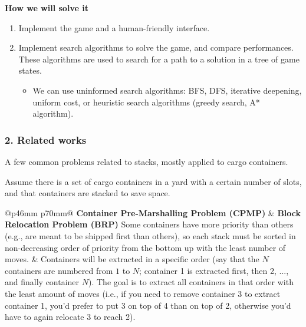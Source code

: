 \documentclass{beamer}
\def\\{}
\begin{document}
\begin{frame}
\textbf{How we will solve it}

\begin{enumerate}
  \itemsep0em
  \item Implement the game and a human-friendly interface.
  \item Implement search algorithms to solve the game, and compare performances. These algorithms are used to search for a path to a solution in a tree of game states.

  \begin{itemize}
    \itemsep0em
    \item We can use uninformed search algorithms: BFS, DFS, iterative deepening, uniform cost, or heuristic search algorithms (greedy search, A* algorithm).
  \end{itemize}
\end{enumerate}

\end{frame}

\begin{frame}
\frametitle{2. Related works}

A few common problems related to stacks, mostly applied to cargo containers.

Assume there is a set of cargo containers in a yard with a certain number of slots, and that containers are stacked to save space.

\vspace{0.5em}

\begin{tabular}{@{}p{46mm} p{70mm}@{}}
  \textbf{Container Pre-Marshalling Problem (CPMP)} & \textbf{Block Relocation Problem (BRP)} \\
  Some containers have more priority than others (e.g., are meant to be shipped first than others), so each stack must be sorted in non-decreasing order of priority from the bottom up with the least number of moves. &
  Containers will be extracted in a specific order (say that the $N$ containers are numbered from $1$ to $N$; container 1 is extracted first, then 2, ..., and finally container $N$). The goal is to extract all containers in that order with the least amount of moves (i.e., if you need to remove container 3 to extract container 1, you'd prefer to put 3 on top of 4 than on top of 2, otherwise you'd have to again relocate 3 to reach 2).
\end{tabular}

\end{frame}
\end{document}
